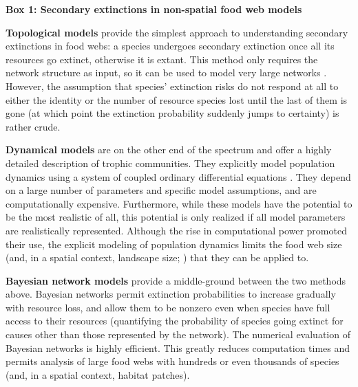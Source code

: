 \documentclass[11pt]{article}
\begin{document}
\clearpage
\nolinenumbers
\begin{mdframed}

\begin{center} \textbf{\Large{Box 1: Secondary extinctions in non-spatial food web models}} \end{center}

\bigskip

\noindent \textbf{Topological models} provide the simplest approach to understanding secondary extinctions in food webs: a species undergoes secondary extinction once all its resources go extinct, otherwise it is extant. This method only requires the network structure as input, so it can be used to model very large networks \citep{Dunne2009}. However, the assumption that species' extinction risks do not respond at all to either the identity or the number of resource species lost until the last of them is gone (at which point the extinction probability suddenly jumps to certainty) is rather crude.

\bigskip

\noindent \textbf{Dynamical models} are on the other end of the spectrum and offer a highly detailed description of trophic communities. They explicitly model population dynamics using a system of coupled ordinary differential equations \citep{Berlow2009, Binzer2011, Curtsdotter2011, Riede2011}. They depend on a large number of parameters and specific model assumptions, and are computationally expensive. Furthermore, while these models have the potential to be the most realistic of all, this potential is only realized if all model parameters are realistically represented. Although the rise in computational power promoted their use, the explicit modeling of population dynamics limits the food web size (and, in a spatial context, landscape size; \citealp{Ryser2019}) that they can be applied to.

\bigskip

\noindent \textbf{Bayesian network models} \citep{Eklofetal2013MEE} provide a middle-ground between the two methods above. Bayesian networks permit extinction probabilities to increase gradually with resource loss, and allow them to be nonzero even when species have full access to their resources (quantifying the probability of species going extinct for causes other than those represented by the network). The numerical evaluation of Bayesian networks is highly efficient. This greatly reduces computation times and permits analysis of large food webs with hundreds or even thousands of species (and, in a spatial context, habitat patches).


\end{mdframed}
\end{document}

